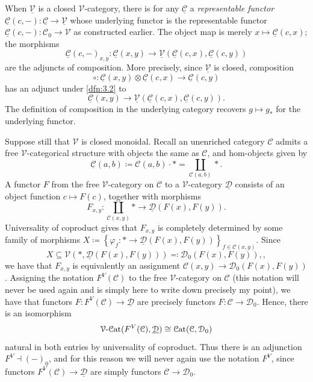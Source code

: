 When $\underline{\mathcal{V} } $ is a closed $\mathcal{V} $-category, there is for any $\underline{\mathcal{C} } $ a \emph{representable functor} $\underline{\mathcal{C} } (c,-): \underline{\mathcal{C} }  \to \underline{\mathcal{V} } $ whose underlying functor is the representable functor $\underline{\mathcal{C} } (c,-): \mathcal{C} _0 \to \mathcal{V} $ as constructed earlier. The object map is merely $x\mapsto \underline{\mathcal{C} } (c,x)$; the morphisms
\[
	\underline{\mathcal{C} } (c,-)_{x,y} : \underline{\mathcal{C} } (x,y) \to \underline{\mathcal{V} } (\underline{\mathcal{C} } (c,x),\underline{\mathcal{C} } (c,y))
\]
are the adjuncts of composition. More precisely, since $\underline{\mathcal{V} } $ is closed, composition
\[
	\circ : \underline{\mathcal{C} } (x,y)\otimes \underline{\mathcal{C} } (c,x) \to \underline{\mathcal{C} }(c,y)
\]
has an adjunct under \cref{dfn:3.2} to
\[
	\underline{\mathcal{C} } (x,y)\to \underline{\mathcal{V} } (\underline{\mathcal{C} } (c,x),\underline{\mathcal{C} } (c,y))
.\]
The definition of composition in the underlying category recovers $g\mapsto g_*$ for the underlying functor.

Suppose still that $\mathcal{V} $ is closed monoidal. Recall an unenriched category $\mathcal{C} $ admits a free $\mathcal{V} $-categorical structure with objects the same as $\mathcal{C} $, and hom-objects given by
\[
	\underline{\mathcal{C} } (a,b)\coloneqq \mathcal{C} (a,b)\cdot * = \coprod_{\mathcal{C} (a,b)} *
.\]
A functor $F$ from the free $\mathcal{V} $-category on $\mathcal{C} $ to a $\mathcal{V} $-category $\underline{\mathcal{D} } $ consists of an object function $c\mapsto F(c)$, together with morphisms
\[
	F_{x,y} :\coprod_{\mathcal{C} (x,y)} * \to \underline{\mathcal{D} } (F(x),F(y))
.\]
Universality of coproduct gives that $F_{x,y} $ is completely determined by some family of morphisms $X\coloneqq \left\{ \varphi_f : * \to \underline{\mathcal{D} } (F(x),F(y)) \right\}_{f\in \mathcal{C} (x,y)} $. Since
\[
	X\subseteq \mathcal{V} (*,\underline{\mathcal{D} } (F(x),F(y)))\eqqcolon \mathcal{D} _0(F(x),F(y)),
,\]
we have that $F_{x,y} $ is equivalently an assignment $\mathcal{C} (x,y)\to \mathcal{D} _0(F(x),F(y))$. Assigning the notation $F^V(\mathcal{C} )$ to the free $\mathcal{V} $-category on $\mathcal{C} $ (this notation will never be used again and is simply here to write down precisely my point), we have that functors $F : F^V(\mathcal{C} ) \to \underline{\mathcal{D} } $ are precisely functors $F : \mathcal{C}  \to \mathcal{D} _0$. Hence, there is an isomorphism
\[
	\mathcal{V} \text{-} \mathcal{C}\mathrm{at} (F^V(\mathcal{C} ),\underline{\mathcal{D} } )\cong \mathcal{C}\mathrm{at} (\mathcal{C} ,\mathcal{D} _0)
\]
natural in both entries by universality of coproduct. Thus there is an adjunction $F^V\dashv (-)_0$, and for this reason we will never again use the notation $F^V$, since functors $F^V(\mathcal{C} )\to \underline{\mathcal{D} } $ are simply functors $\mathcal{C} \to \mathcal{D} _0$.

